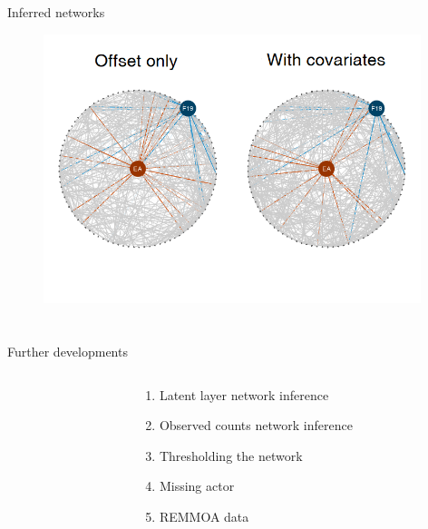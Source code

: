 \documentclass[9pt]{beamer}
\newcommand{\bleu}[1]{\textcolor{Framableulight}{#1}}
\begin{document}
\begin{frame}{Inferred networks}
\begin{figure}[htp]
\centering
\includegraphics[width=11cm]{compare_reseaux.png}

\end{figure}

\end{frame}
\section{}
\subsection{}
\begin{frame}{}
\begin{center}
\huge{\bleu{Further developments}} \bigskip
\end{center}
\begin{columns}
\begin{column}{3cm}
\end{column}
\begin{column}{10cm}
\Large{
\begin{enumerate}
	\item Latent layer network inference
	\item Observed counts network inference
	\item Thresholding the network
	\item Missing actor
	\item REMMOA data
\end{enumerate}}
\end{column}
\end{columns}
\end{frame}
\end{document}
